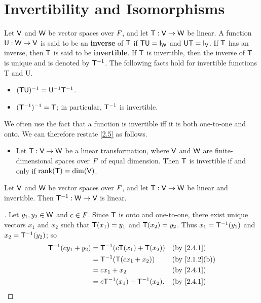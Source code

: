 \section{Invertibility and Isomorphisms}\label{sec:2.4}

\begin{defn}\label{2.4.1}
  Let \(\mathsf{V}\) and \(\mathsf{W}\) be vector spaces over \(\mathit{F}\), and let \(\mathsf{T} : \mathsf{V} \to \mathsf{W}\) be linear.
  A function \(\mathsf{U} : \mathsf{W} \to \mathsf{V}\) is said to be an \textbf{inverse} of \(\mathsf{T}\) if \(\T \U = \IT[\W]\) and \(\U \T = \IT[\V]\).
  If \(\mathsf{T}\) has an inverse, then \(\mathsf{T}\) is said to be \textbf{invertible}.
  If \(\mathsf{T}\) is invertible, then the inverse of \(\mathsf{T}\) is unique and is denoted by \(\mathsf{T}^{-1}\).
  The following facts hold for invertible functions T and U.
  \begin{itemize}
    \item \((\mathsf{T} \mathsf{U})^{-1} = \mathsf{U}^{-1} \mathsf{T}^{-1}\).
    \item \((\mathsf{T}^{-1})^{-1} = \mathsf{T}\);
          in particular, \(\mathsf{T}^{-1}\) is invertible.
  \end{itemize}
  We often use the fact that a function is invertible iff it is both one-to-one and onto.
  We can therefore restate \cref{2.5} as follows.
  \begin{itemize}
    \item Let \(\mathsf{T} : \mathsf{V} \to \mathsf{W}\) be a linear transformation, where \(\mathsf{V}\) and \(\mathsf{W}\) are finite-dimensional spaces over \(\mathit{F}\) of equal dimension.
          Then \(\mathsf{T}\) is invertible if and only if \(\rk{\T} = \dim(\V)\).
  \end{itemize}
\end{defn}

\begin{thm}\label{2.17}
  Let \(\mathsf{V}\) and \(\mathsf{W}\) be vector spaces over \(\mathit{F}\), and let \(\mathsf{T} : \mathsf{V} \to \mathsf{W}\) be linear and invertible.
  Then \(\mathsf{T}^{-1} : \mathsf{W} \to \mathsf{V}\) is linear.
\end{thm}

\begin{proof}[]
  Let \(y_1, y_2 \in \mathsf{W}\) and \(c \in \mathit{F}\).
  Since \(\mathsf{T}\) is onto and one-to-one, there exist unique vectors \(x_1\) and \(x_2\) such that \(\mathsf{T}(x_1) = y_1\) and \(\mathsf{T}(x_2) = y_2\).
  Thus \(x_1 = \mathsf{T}^{-1}(y_1)\) and \(x_2 = \mathsf{T}^{-1}(y_2)\);
  so
  \begin{align*}
    \T^{-1}(c y_1 + y_2) & = \T^{-1}(c \T(x_1) + \T(x_2))   &  & \text{(by \cref{2.4.1})}    \\
                         & = \T^{-1}(\T(c x_1 + x_2))       &  & \text{(by \cref{2.1.2}(b))} \\
                         & = c x_1 + x_2                    &  & \text{(by \cref{2.4.1})}    \\
                         & = c \T^{-1}(x_1) + \T^{-1}(x_2). &  & \text{(by \cref{2.4.1})}
  \end{align*}
\end{proof}


